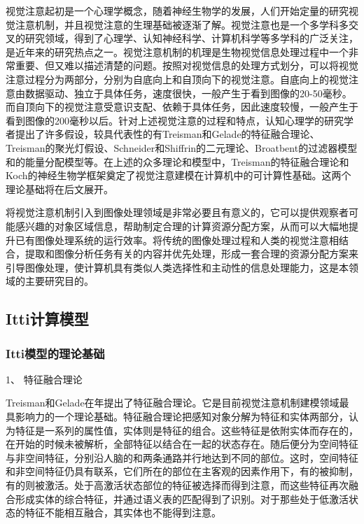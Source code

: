 \documentclass[a4paper,12pt]{article}
\begin{document}
视觉注意起初是一个心理学概念，随着神经生物学的发展，人们开始定量的研究视觉注意机制，并且视觉注意的生理基础被逐渐了解。视觉注意也是一个多学科多交叉的研究领域，得到了心理学、认知神经科学、计算机科学等多学科的广泛关注，是近年来的研究热点之一。视觉注意机制的机理是生物视觉信息处理过程中一个非常重要、但又难以描述清楚的问题。按照对视觉信息的处理方式划分，可以将视觉注意过程分为两部分，分别为自底向上和自顶向下的视觉注意。自底向上的视觉注意由数据驱动、独立于具体任务，速度很快，一般产生于看到图像的20-50毫秒。而自顶向下的视觉注意受意识支配、依赖于具体任务，因此速度较慢，一般产生于看到图像的200毫秒以后。针对上述视觉注意的过程和特点，认知心理学的研究学者提出了许多假设，较具代表性的有\cite{4:article}Treisman和Gelade的特征融合理论、Treisman的聚光灯假设、Schneider和Shiffrin的二元理论、Broatbent的过滤器模型和的能量分配模型等。在上述的众多理论和模型中，Treisman的特征融合理论和Koch的神经生物学框架\cite{5:article}奠定了视觉注意建模在计算机中的可计算性基础。这两个理论基础将在后文展开。


将视觉注意机制引入到图像处理领域是非常必要且有意义的，它可以提供观察者可能感兴趣的对象区域信息，帮助制定合理的计算资源分配方案，从而可以大幅地提升已有图像处理系统的运行效率。将传统的图像处理过程和人类的视觉注意相结合，提取和图像分析任务有关的内容并优先处理，形成一套合理的资源分配方案来引导图像处理，使计算机具有类似人类选择性和主动性的信息处理能力，这是本领域的主要研究目的。


\subsection{Itti计算模型}

\subsubsection{Itti模型的理论基础}


1、 特征融合理论


Treisman和Gelade在年提出了特征融合理论。它是目前视觉注意机制建模领域最具影响力的一个理论基础。特征融合理论把感知对象分解为特征和实体两部分，认为特征是一系列的属性值，实体则是特征的组合。这些特征是依附实体而存在的，在开始的时候未被解析，全部特征以结合在一起的状态存在。随后便分为空间特征与非空间特征，分别沿人脑的和两条通路并行地达到不同的部位。这时，空间特征和非空间特征仍具有联系，它们所在的部位在主客观的因素作用下，有的被抑制，有的则被激活。处于高激活状态部位的特征被选择而得到注意，而这些特征再次融合形成实体的综合特征，并通过语义表的匹配得到了识别。对于那些处于低激活状态的特征不能相互融合，其实体也不能得到注意。
\end{document}
